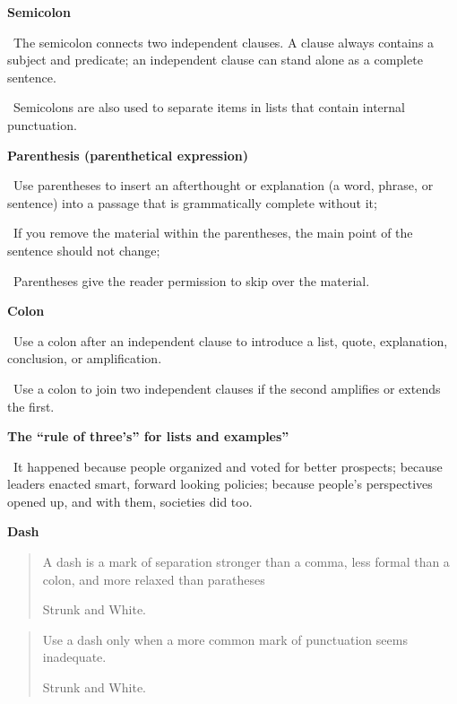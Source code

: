 \documentclass[a4paper, 12pt]{article}
\begin{document}
\textbf{Semicolon}
\par\textbullet\ The semicolon connects two independent clauses. A clause always contains a subject and predicate; an independent clause can stand alone as a complete sentence.
\par\textbullet\ Semicolons are also used to separate items in lists that contain internal punctuation.

\textbf{Parenthesis (parenthetical expression)}
\par\textbullet\ Use parentheses to insert an afterthought or explanation (a word, phrase, or sentence) into a passage that is grammatically complete without it;
\par\textbullet\ If you remove the material within the parentheses, the main point of the sentence should not change;
\par\textbullet\ Parentheses give the reader permission to skip over the material.

\textbf{Colon}
\par\textbullet\ Use a colon after an independent clause to introduce a list, quote, explanation, conclusion, or amplification.
\par\textbullet\ Use a colon to join two independent clauses if the second amplifies or extends the first.

\textbf{The ``rule of three's'' for lists and examples''}
\par\textbullet\ It happened because people organized and voted for better prospects; because leaders enacted smart, forward looking policies; because people's perspectives opened up, and with them, societies did too.

\newpage\textbf{Dash}

\vspace{4pt}\begin{quote}
    A dash is a mark of separation stronger than a comma, less formal than a colon, and more relaxed than paratheses
\begin{flushright}
Strunk and White.
\end{flushright}
\end{quote}

\vspace{4pt}\begin{quote}
    Use a dash only when a more common mark of punctuation seems inadequate.
\begin{flushright}
Strunk and White.
\end{flushright}
\end{quote}
\end{document}
